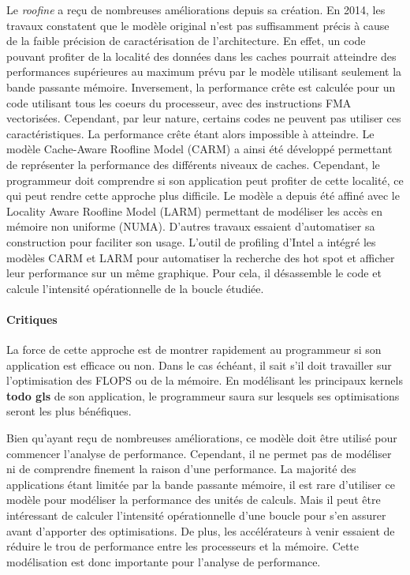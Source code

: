         
            Le \textit{roofine} a reçu de nombreuses améliorations depuis sa création. En 2014, les travaux \cite{Ilic2014} constatent que le modèle original n’est pas suffisamment précis à cause de la faible précision de caractérisation de l’architecture. En effet, un code pouvant profiter de la localité des données dans les caches pourrait atteindre des performances supérieures au maximum prévu par le modèle utilisant seulement la bande passante mémoire. Inversement, la performance crête est calculée pour un code utilisant tous les coeurs du processeur, avec des instructions \gls{FMA} vectorisées. Cependant, par leur nature, certains codes ne peuvent pas utiliser ces  caractéristiques. La performance crête étant alors impossible à atteindre. Le modèle Cache-Aware Roofline Model (CARM) \cite{Ilic2014} a ainsi été développé permettant de représenter la performance des différents niveaux de caches. Cependant, le programmeur doit comprendre si son application peut profiter de cette localité, ce qui peut rendre cette approche plus difficile. Le modèle a depuis été affiné avec le Locality Aware Roofline Model (LARM) \cite{Denoyelle2018} permettant de modéliser les accès en mémoire non uniforme (NUMA).
            D’autres travaux essaient d’automatiser sa construction \cite{lo2014roofline} pour faciliter son usage. L’outil de profiling d’Intel a intégré les modèles CARM et LARM pour automatiser la recherche des hot spot et afficher leur performance sur un même graphique. Pour cela, il désassemble le code et calcule l’intensité opérationnelle de la boucle étudiée.

        \paragraph{Critiques}

            
            La force de cette approche est de montrer rapidement au programmeur si son application est efficace ou non. Dans le cas échéant, il sait s’il doit travailler sur l’optimisation des FLOPS ou de la mémoire. En modélisant les principaux kernels \textbf{todo gls} de son application, le programmeur saura sur lesquels ses optimisations seront les plus bénéfiques.
            
            Bien qu'ayant reçu de nombreuses améliorations, ce modèle doit être utilisé pour commencer l’analyse de performance. Cependant, il ne permet pas de modéliser ni de comprendre finement la raison d’une performance.
            La majorité des applications étant limitée par la bande passante mémoire, il est rare d’utiliser ce modèle pour modéliser la performance des unités de calculs. Mais il peut être intéressant de calculer l’intensité opérationnelle d’une boucle pour s’en assurer avant d’apporter des optimisations. De plus, les accélérateurs à venir essaient de réduire le trou de performance entre les processeurs et la mémoire. Cette modélisation est donc importante pour l’analyse de performance.


